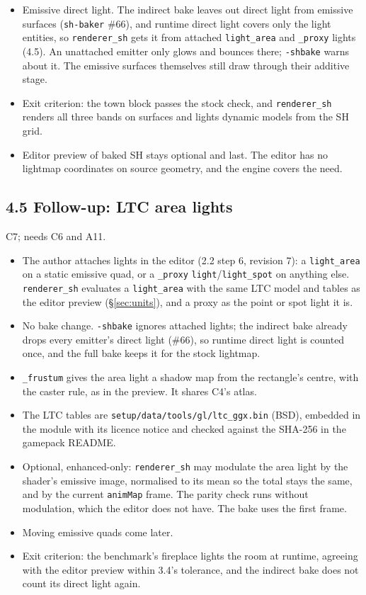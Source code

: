 \documentclass[11pt,a4paper]{article}
\begin{document}
\begin{itemize}
  lightmap, grid and vertex colours.
\item Emissive direct light. The indirect bake leaves out direct light from emissive surfaces
  (\texttt{sh-baker} \#66), and runtime direct light covers only the light entities, so
  \texttt{renderer\_sh} gets it from attached \texttt{light\_area} and \texttt{\_proxy} lights (4.5).
  An unattached emitter only glows and bounces there; \texttt{-shbake} warns about it. The emissive
  surfaces themselves still draw through their additive stage.
\item Exit criterion: the town block passes the stock check, and \texttt{renderer\_sh} renders all
  three bands on surfaces and lights dynamic models from the SH grid.
\item Editor preview of baked SH stays optional and last. The editor has no lightmap coordinates on
  source geometry, and the engine covers the need.
\end{itemize}

\subsection{4.5 Follow-up: LTC area lights}
C7; needs C6 and A11.
\begin{itemize}
\item The author attaches lights in the editor (2.2 step 6, revision 7): a \texttt{light\_area} on
  a static emissive quad, or a \texttt{\_proxy} \texttt{light}/\texttt{light\_spot} on anything
  else. \texttt{renderer\_sh} evaluates a \texttt{light\_area} with the same LTC model and tables as
  the editor preview (§\ref{sec:units}), and a proxy as the point or spot light it is.
\item No bake change. \texttt{-shbake} ignores attached lights; the indirect bake already drops
  every emitter's direct light (\#66), so runtime direct light is counted once, and the full bake
  keeps it for the stock lightmap.
\item \texttt{\_frustum} gives the area light a shadow map from the rectangle's centre, with the
  caster rule, as in the preview. It shares C4's atlas.
\item The LTC tables are \texttt{setup/data/tools/gl/ltc\_ggx.bin} (BSD), embedded in the module
  with its licence notice and checked against the SHA-256 in the gamepack README.
\item Optional, enhanced-only: \texttt{renderer\_sh} may modulate the area light by the shader's
  emissive image, normalised to its mean so the total stays the same, and by the current
  \texttt{animMap} frame. The parity check runs without modulation, which the editor does not have.
  The bake uses the first frame.
\item Moving emissive quads come later.
\item Exit criterion: the benchmark's fireplace lights the room at runtime, agreeing with the editor
  preview within 3.4's tolerance, and the indirect bake does not count its direct light again.
\end{itemize}
\end{document}
